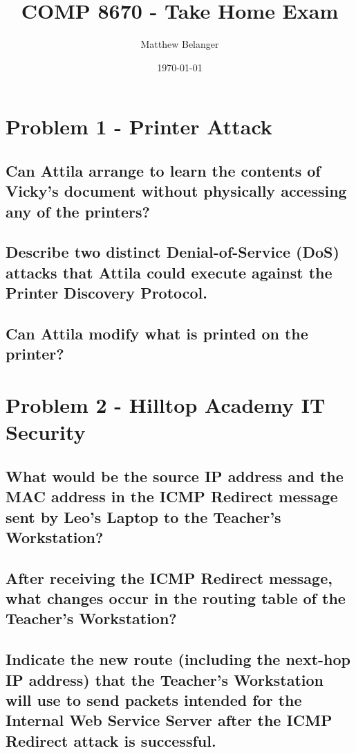 \documentclass{article}
\title{COMP 8670 - Take Home Exam}
\author{Matthew Belanger}
\date{\today}
\begin{document}
\maketitle

\section{Problem 1 - Printer Attack}

\subsection{Can Attila arrange to learn the contents of Vicky’s document without physically
accessing any of the printers?}

\subsection{Describe two distinct Denial-of-Service (DoS) attacks that Attila could execute
against the Printer Discovery Protocol.}

\subsection{Can Attila modify what is printed on the printer?}

\section{Problem 2 - Hilltop Academy IT Security}
\label{sec:hilltop}

\subsection{What would be the source IP address and the MAC address in the ICMP
Redirect message sent by Leo’s Laptop to the Teacher’s Workstation?}

\subsection{After receiving the ICMP Redirect message, what changes occur in the routing
table of the Teacher’s Workstation?}

\subsection{Indicate the new route (including the next-hop IP address) that the Teacher’s
Workstation will use to send packets intended for the Internal Web Service Server after
the ICMP Redirect attack is successful.}
\end{document}
